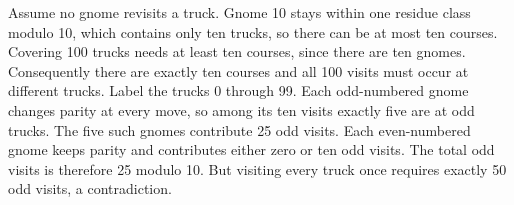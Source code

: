 Assume no gnome revisits a truck. Gnome 10 stays within one residue class modulo 10, which contains only ten trucks, so there can be at most ten courses. Covering 100 trucks needs at least ten courses, since there are ten gnomes. Consequently there are exactly ten courses and all 100 visits must occur at different trucks. Label the trucks 0 through 99. Each odd-numbered gnome changes parity at every move, so among its ten visits exactly five are at odd trucks. The five such gnomes contribute 25 odd visits. Each even-numbered gnome keeps parity and contributes either zero or ten odd visits. The total odd visits is therefore 25 modulo 10. But visiting every truck once requires exactly 50 odd visits, a contradiction.
